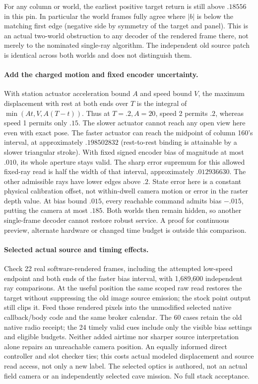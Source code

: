 \documentclass{article}
\begin{document}
For any column or world, the earliest positive target return is
still above $.18556$ in this pin. In particular the world frames
fully agree where $|b|$ is below the matching first edge (negative
side by symmetry of the target and panel). This is an actual
two-world obstruction to any decoder of the rendered frame there,
not merely to the nominated single-ray algorithm. The independent
old source patch is identical across both worlds and does not
distinguish them.

\paragraph{Add the charged motion and fixed encoder uncertainty.}
With station actuator acceleration bound $A$ and speed bound $V$,
the maximum displacement with rest at both ends over $T$ is the
integral of $\min(At,V,A(T-t))$. Thus at $T=.2,A=20$, speed 2
permits $.2$, whereas speed 1 permits only $.15$. The slower
actuator cannot reach any open view here even with exact pose.
The faster actuator can reach the midpoint of column 160's interval,
at approximately $.198502832$ (rest-to-rest binding is attainable
by a slower triangular stroke). With fixed signed encoder bias of
magnitude at most $.010$, its whole aperture stays valid. The
sharp error supremum for this allowed fixed-ray read is half the
width of that interval, approximately $.012936630$. The other
admissible rays have lower edges above $.2$. State error here is a
constant physical calibration offset, not within-dwell camera
motion or error in the raster depth value. At bias bound $.015$,
every reachable command admits bias $-.015$, putting the camera
at most $.185$. Both worlds then remain hidden, so another
single-frame decoder cannot restore robust service. A proof for
continuous preview, alternate hardware or changed time budget is
outside this comparison.

\paragraph{Selected actual source and timing effects.}
Check 22 real software-rendered frames, including the attempted
low-speed endpoint and both ends of the faster bias interval, with
1,689,600 independent ray comparisons. At the useful position the
same scoped raw read restores the target without suppressing the
old image source emission; the stock point output still clips it.
Feed those rendered pixels into the unmodified selected native
callback/body code and the same broker calendar. The 60 cases
retain the old native radio receipt; the 24 timely valid cues
include only the visible bias settings and eligible budgets.
Neither added airtime nor sharper source interpretation alone
repairs an unreachable camera position. An equally informed
direct controller and slot checker ties; this costs actual
modeled displacement and source read access, not only a new label.
The selected optics is authored, not an actual field camera or an
independently selected cave mission. No full stack acceptance.
\end{document}
